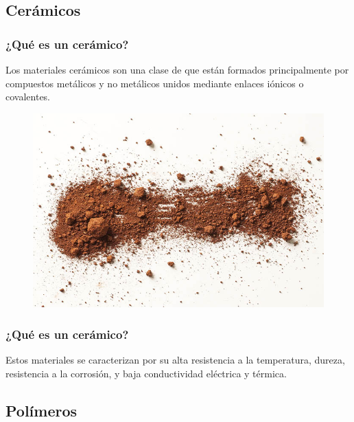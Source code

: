 \documentclass[14pt]{beamer}
\begin{document}
\subsection{Cerámicos}

\begin{frame}
\frametitle{¿Qué es un cerámico?}
Los materiales cerámicos son una clase de  \pause que están formados principalmente por compuestos metálicos y no metálicos \pause unidos mediante enlaces iónicos o covalentes.
\end{frame}
\begin{frame}
\begin{figure}
    \centering
    \includegraphics[scale=0.7]{Imagenes/Piezoelectricidad_03.jpg}
\end{figure}
\end{frame}
\begin{frame}
\frametitle{¿Qué es un cerámico?}
Estos materiales se caracterizan por su alta resistencia a la temperatura, \pause dureza, \pause resistencia a la corrosión, \pause y baja conductividad eléctrica y térmica.
\end{frame}

\subsection{Polímeros}
\end{document}
